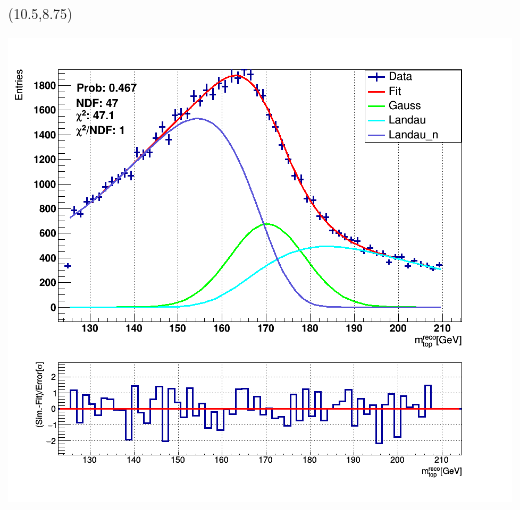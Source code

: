 \documentclass[green,compress,10pt]{beamer}
\begin{document}
{\begin{textblock}{7.5}
	
\end{textblock}	

\begin{textblock}{7.5}(10.5,8.75)
	
	\includegraphics[width=0.725\linewidth]{PicsTop/170mtop.png}
	
	
\end{textblock}	

}
\end{document}

